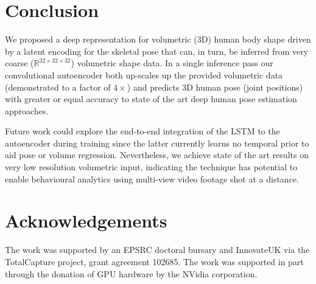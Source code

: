 \documentclass[runningheads]{llncs}
\begin{document}
\section{Conclusion}

We proposed a deep representation for volumetric (3D) human body shape driven by a latent encoding for the skeletal pose that can, in turn, be inferred from very coarse ($\mathbb{R}^{32 \times 32 \times 32}$) volumetric shape data.  In a single inference pass our convolutional autoencoder both up-scales up the provided volumetric data (demonstrated to a factor of $4 \times$) and predicts 3D human pose (joint positions) with greater or equal accuracy to state of the art deep human pose estimation approaches.  

Future work could explore the end-to-end integration of the LSTM to the autoencoder during training since the latter currently learns no temporal prior to aid pose or volume regression.  Nevertheless, we achieve state of the art results on very low resolution volumetric input, indicating the technique has potential to enable behavioural analytics using multi-view video footage shot at a distance.

\section*{Acknowledgements}
The work was supported by an EPSRC doctoral bursary and InnovateUK via the TotalCapture project, grant agreement 102685.   The work was supported in part through the donation of GPU hardware by the NVidia corporation.



\end{document}
